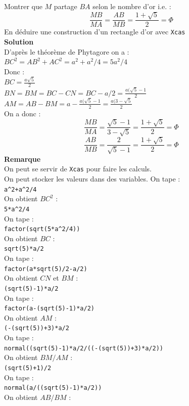 \documentclass[a4paper,11pt]{book}
\begin{document}
Montrer que $M$ partage $BA$ selon le nombre d'or i.e. :
$$\frac{MB}{MA}=\frac{AB}{MB}=\frac{1+\sqrt 5}{2}=\Phi$$
En d\'eduire une construction d'un rectangle d'or avec {\tt Xcas}\\
{\bf Solution}\\
D'apr\`es le th\'eor\`eme de Phytagore on a :\\
$BC^2=AB^2+AC^2=a^2+a^2/4=5a^2/4$\\
Donc :\\
$\displaystyle BC=\frac{a\sqrt 5}{2}$\\
$\displaystyle BN=BM=BC-CN=BC-a/2=\frac{a(\sqrt 5-1}{2}$\\
$\displaystyle AM=AB-BM=a-\frac{a(\sqrt 5-1}{2}=\frac{a(3-\sqrt 5}{2}$\\
On a donc :
$$\frac{MB}{MA}=\frac{\sqrt 5-1}{3-\sqrt 5}=\frac{1+\sqrt 5}{2}=\Phi$$
$$\frac{AB}{MB}=\frac{2}{\sqrt 5-1}=\frac{1+\sqrt 5}{2}=\Phi$$
{\bf Remarque}\\
On peut se servir de {\tt Xcas} pour faire les calculs.\\
On peut stocker les valeurs dans des variables.
On tape :\\
{\tt a\verb|^|2+a\verb|^|2/4}\\
On obtient $BC^2$ :\\
{\tt 5*a\verb|^|2/4}\\
On tape :\\
{\tt factor(sqrt(5*a\verb|^|2/4))}\\
On obtient $BC$ :\\
{\tt sqrt(5)*a/2}\\
On tape :\\
{\tt factor(a*sqrt(5)/2-a/2)}\\
On obtient $CN$ et $BM$ :\\
{\tt (sqrt(5)-1)*a/2}\\
On tape :\\
{\tt factor(a-(sqrt(5)-1)*a/2)}\\
On obtient $AM$ :\\
{\tt (-(sqrt(5))+3)*a/2}\\
On tape :\\
{\tt normal((sqrt(5)-1)*a/2/((-(sqrt(5))+3)*a/2))}\\
On obtient $BM/AM$ :\\
{\tt (sqrt(5)+1)/2}\\
On tape :\\
{\tt normal(a/((sqrt(5)-1)*a/2))}\\
On obtient $AB/BM$ :\\
\end{document}
